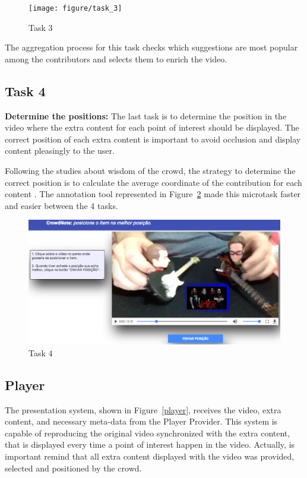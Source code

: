 		
\begin{figure}[h!]
	\centerline{\texttt{[image: figure/task\_3]}}
	\caption{Task 3}
	\label{task_3}
\end{figure}

The aggregation process for this task checks which suggestions are most popular among the contributors and selects them to enrich the video.

\subsection{Task 4}

\textbf{Determine the positions:} The last task is to determine the position in the video where the extra content for each point of interest should be displayed. The correct position of each extra content is important to avoid occlusion and display content pleasingly to the user.

Following the studies about wisdom  of the crowd, the strategy to determine the correct position is to calculate the average coordinate of the contribution for each content \citep{GALTON1907}. The annotation tool represented in Figure~\ref{task_4} made this microtask faster and easier between the 4 tasks.

\begin{figure}[h!]
	\centerline{\includegraphics[scale=0.22] {figure/task_4}}
	\caption{Task 4}
	\label{task_4}
\end{figure}

\subsection{Player}

The presentation system, shown in Figure~\ref{player}, receives the video, extra content, and necessary meta-data from the Player Provider. This system is capable of reproducing the original video synchronized with the extra content, that is displayed every time a point of interest happen in the video. Actually, is important remind that all extra content displayed with the video was provided, selected and positioned by the crowd.

